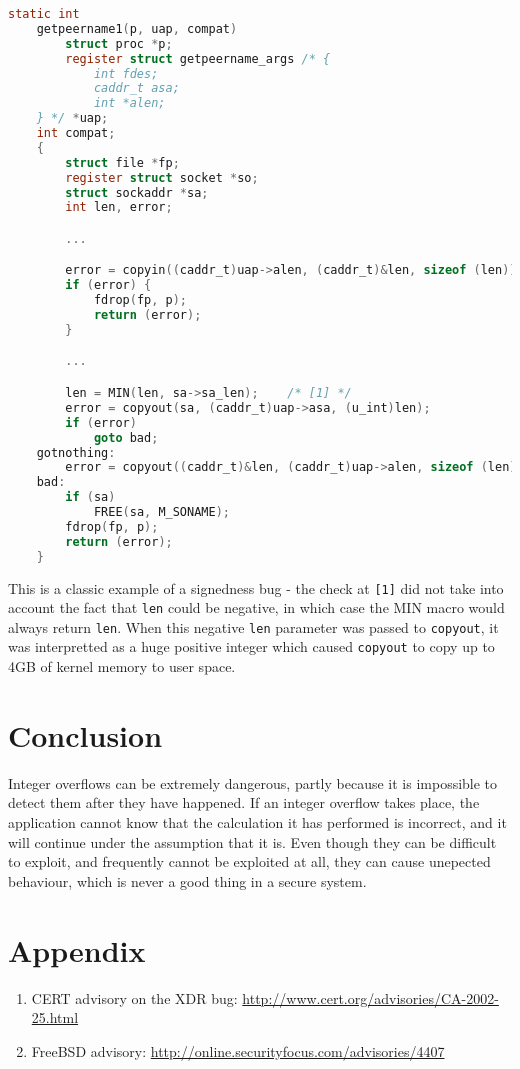 \documentclass{iacrtrans}
\begin{document}
\begin{lstlisting}[language=c]
    static int
    getpeername1(p, uap, compat)
        struct proc *p;
        register struct getpeername_args /* {
            int	fdes;
            caddr_t asa;
            int	*alen;
    } */ *uap;
    int compat;
    {
        struct file *fp;
        register struct socket *so;
        struct sockaddr *sa;
        int len, error;

        ...

        error = copyin((caddr_t)uap->alen, (caddr_t)&len, sizeof (len));
        if (error) {
            fdrop(fp, p);
            return (error);
        }

        ...

        len = MIN(len, sa->sa_len);    /* [1] */
        error = copyout(sa, (caddr_t)uap->asa, (u_int)len);
        if (error)
            goto bad;
    gotnothing:
        error = copyout((caddr_t)&len, (caddr_t)uap->alen, sizeof (len));
    bad:
        if (sa)
            FREE(sa, M_SONAME);
        fdrop(fp, p);
        return (error);
    }
\end{lstlisting}

This is a classic example of a signedness bug - the check at \texttt{[1]} did not
take into account the fact that \texttt{len} could be negative, in which case the
MIN macro would always return \texttt{len}.  When this negative \texttt{len} parameter was
passed to \texttt{copyout}, it was interpretted as a huge positive integer which
caused \texttt{copyout} to copy up to 4GB of kernel memory to user space.


\section{Conclusion}

Integer overflows can be extremely dangerous, partly because it is
impossible to detect them after they have happened.  If an integer overflow
takes place, the application cannot know that the calculation it has
performed is incorrect, and it will continue under the assumption that it
is.  Even though they can be difficult to exploit, and frequently cannot be
exploited at all, they can cause unepected behaviour, which is never a good
thing in a secure system.


\appendix
\section{Appendix}

\begin{enumerate}
    \item CERT advisory on the XDR bug:
    \url{http://www.cert.org/advisories/CA-2002-25.html}
    \item FreeBSD advisory: \url{http://online.securityfocus.com/advisories/4407}
\end{enumerate}
\end{document}

